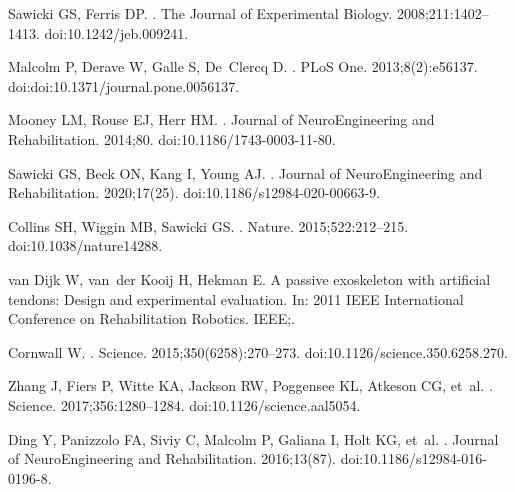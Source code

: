 \documentclass[10pt,letterpaper]{article}
\begin{document}
\nolinenumbers

\begin{thebibliography}{10}

Sawicki GS, Ferris DP.
.
\newblock The Journal of Experimental Biology. 2008;211:1402--1413.
\newblock doi:{10.1242/jeb.009241}.

Malcolm P, Derave W, Galle S, De~Clercq D.
.
\newblock PLoS One. 2013;8(2):e56137.
\newblock doi:{doi:10.1371/journal.pone.0056137}.

Mooney LM, Rouse EJ, Herr HM.
.
\newblock Journal of NeuroEngineering and Rehabilitation. 2014;80.
\newblock doi:{10.1186/1743-0003-11-80}.

Sawicki GS, Beck ON, Kang I, Young AJ.
.
\newblock Journal of NeuroEngineering and Rehabilitation. 2020;17(25).
\newblock doi:{10.1186/s12984-020-00663-9}.

Collins SH, Wiggin MB, Sawicki GS.
.
\newblock Nature. 2015;522:212--215.
\newblock doi:{10.1038/nature14288}.

van Dijk W, van~der Kooij H, Hekman E.
\newblock A passive exoskeleton with artificial tendons: Design and
  experimental evaluation.
\newblock In: 2011 IEEE International Conference on Rehabilitation Robotics.
  IEEE;.

Cornwall W.
.
\newblock Science. 2015;350(6258):270--273.
\newblock doi:{10.1126/science.350.6258.270}.

Zhang J, Fiers P, Witte KA, Jackson RW, Poggensee KL, Atkeson CG, et~al.
.
\newblock Science. 2017;356:1280–1284.
\newblock doi:{10.1126/science.aal5054}.

Ding Y, Panizzolo FA, Siviy C, Malcolm P, Galiana I, Holt KG, et~al.
.
\newblock Journal of NeuroEngineering and Rehabilitation. 2016;13(87).
\newblock doi:{10.1186/s12984-016-0196-8}.


\end{thebibliography}
\end{document}
